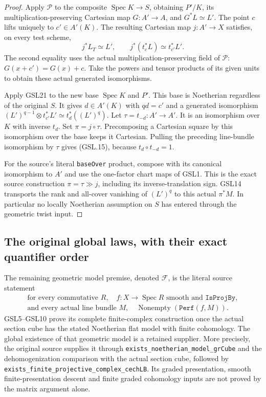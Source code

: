 \begin{proof}
Apply $\mathcal P$ to the composite $\operatorname{Spec}K\to S$,
obtaining $P'/K$, its multiplication-preserving Cartesian
map $G:A'\to A$, and $G^*L\simeq L'$.  The point $c$ lifts
uniquely to $c'\in A'(K)$.  The resulting Cartesian map
$j:A'\to X$ satisfies, on every test scheme,
\[
 j^*L_T\simeq L',\qquad
 j^*(t_c^*L)\simeq t_{c'}^*L'.
 \tag{GSL.16}
\]
The second equality uses the actual multiplication-preserving
field of $\mathcal P$: $G(x+c')=G(x)+c$.
Take the powers and tensor products of its given units to
obtain these actual generated isomorphisms.

Apply GSL21 to the new base $\operatorname{Spec}K$ and $P'$.
This base is Noetherian regardless of the original $S$.
It gives $d\in A'(K)$ with $qd=c'$ and a generated
isomorphism
$(L')^{q-1}\otimes t_{c'}^*L'\simeq t_d^*((L')^q)$.
Let $\tau=t_{-d}:A'\to A'$.  It is an isomorphism over $K$
with inverse $t_d$.  Set $\pi=j\circ\tau$.
Precomposing a Cartesian square by this isomorphism over the
base keeps it Cartesian.  Pulling the preceding line-bundle
isomorphism by $\tau$ gives (GSL.15), because
$t_d\circ t_{-d}=1$.

For the source's literal \texttt{baseOver} product, compose
with its canonical isomorphism to $A'$ and use the one-factor
chart maps of GSL1.  This is the exact source construction
$\pi=\tau\gg j$, including its inverse-translation sign.
GSL14 transports the rank and all-cover vanishing of $(L')^q$
to this actual $\pi^*M$.  In particular no locally Noetherian
assumption on $S$ has entered through the geometric twist input.
\end{proof}

\subsection{The original global laws, with their exact quantifier order}

The remaining geometric model premise, denoted $\mathcal F$, is the
literal source statement
\[
 \begin{gathered}
 \text{for every commutative }R,\quad
 f:X\to\operatorname{Spec}R\text{ smooth and }\texttt{IsProjBy},\\
 \text{and every actual line bundle }M,\quad
        \operatorname{Nonempty}(\texttt{Perf}(f,M)).
 \end{gathered} \tag{GSL.17}
\]
GSL5--GSL10 prove its complete finite-complex construction once the
actual section cube has the stated Noetherian flat model with finite
cohomology.  The global existence of that geometric model is a retained
supplier.  More precisely, the original source supplies it through
\texttt{exists\_noetherian\_model\_grCube} and the dehomogenization
comparison with the actual section cube, followed by
\texttt{exists\_finite\_projective\_complex\_cechLB}.  Its graded
presentation, smooth finite-presentation descent and finite graded
cohomology inputs are not proved by the matrix argument alone.


